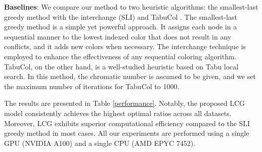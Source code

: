 \documentclass[a4paper,journal]{IEEEtran}
\begin{document}
\textbf{Baselines}:
We compare our method to two heuristic algorithms: the smallest-last greedy method with the interchange (SLI) \cite{matula1983smallest, deo2006interchange} and TabuCol \cite{hertz1987using}. The smallest-last greedy method is a simple yet powerful approach. It assigns each node in a sequential manner to the lowest indexed color that does not result in any conflicts, and it adds new colors when necessary. The interchange technique is employed to enhance the effectiveness of any sequential coloring algorithm.
% 
TabuCol, on the other hand, is a well-studied heuristic based on Tabu local search. In this method, the chromatic number is assumed to be given, and we set the maximum number of iterations for TabuCol to 1000.

The results are presented in Table \ref{performance}. Notably, the proposed LCG model consistently achieves the highest optimal ratios across all datasets. Moreover, LCG exhibits superior computational efficiency compared to the SLI greedy method in most cases. All our experiments are performed using a single GPU (NVIDIA A100) and a single CPU (AMD EPYC 7452).

\begin{table}[htbp]
	\centering
	\caption{Optimal ratio on test graphs, where the best ratios are marked in bold. Running times (in seconds) are provided in brackets. In this table, training and testing use data from the same distribution. }
	\label{performance}
	\begin{footnotesize}		
	\end{footnotesize}
\end{table}
\end{document}
